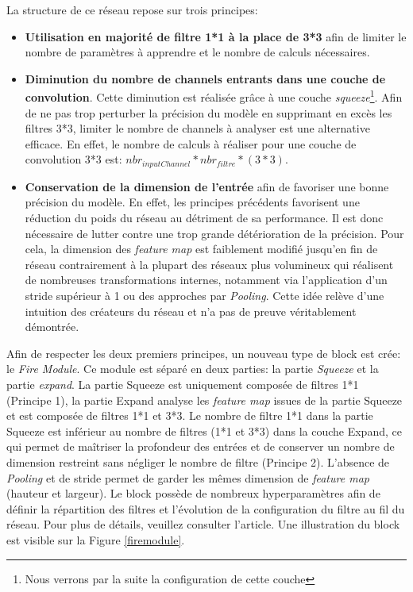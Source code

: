 \noindent La structure de ce réseau repose sur trois principes:

\begin{itemize}
    \item \textbf{Utilisation en majorité de filtre 1*1 à la place de 3*3} afin de limiter le nombre de paramètres à apprendre et le nombre de calculs nécessaires.

    \item \textbf{Diminution du nombre de channels entrants dans une couche de convolution}. Cette diminution est réalisée grâce à une couche \textit{squeeze}\footnote{Nous verrons par la suite la configuration de cette couche}. Afin de ne pas trop perturber la précision du modèle en supprimant en excès les filtres 3*3, limiter le nombre de channels à analyser est une alternative efficace. En effet, le nombre de calculs à réaliser pour une couche de convolution 3*3 est: $nbr_{inputChannel}*nbr_{filtre}*(3*3)$.

    \item \textbf{Conservation de la dimension de l'entrée} afin de favoriser une bonne précision du modèle. En effet, les principes précédents favorisent une réduction du poids du réseau au détriment de sa performance. Il est donc nécessaire de lutter contre une trop grande détérioration de la précision. Pour cela, la dimension des \textit{\textit{feature map}} est faiblement modifié jusqu'en fin de réseau contrairement à la plupart des réseaux plus volumineux qui réalisent de nombreuses transformations internes, notamment via l'application d'un stride supérieur à 1 ou des approches par \textit{Pooling}. Cette idée relève d'une intuition des créateurs du réseau et n'a pas de preuve véritablement démontrée.
\end{itemize}

\noindent Afin de respecter les deux premiers principes, un nouveau type de block est crée: le \textit{Fire Module}. Ce module est séparé en deux parties: la partie \textit{Squeeze} et la partie \textit{expand}. La partie Squeeze est uniquement composée de filtres 1*1 (Principe 1), la partie Expand analyse les \textit{\textit{feature map}} issues de la partie Squeeze et est composée de filtres 1*1 et 3*3. Le nombre de filtre 1*1 dans la partie Squeeze est inférieur au nombre de filtres (1*1 et 3*3) dans la couche Expand, ce qui permet de maîtriser la profondeur des entrées et de conserver un nombre de dimension restreint sans négliger le nombre de filtre (Principe 2). L'absence de \textit{Pooling} et de stride permet de garder les mêmes dimension de \textit{feature map} (hauteur et largeur). Le block possède de nombreux hyperparamètres afin de définir la répartition des filtres et l'évolution de la configuration du filtre au fil du réseau. Pour plus de détails, veuillez consulter l'article\cite{squeezenet}. Une illustration du block est visible sur la Figure \ref{firemodule}.\\

